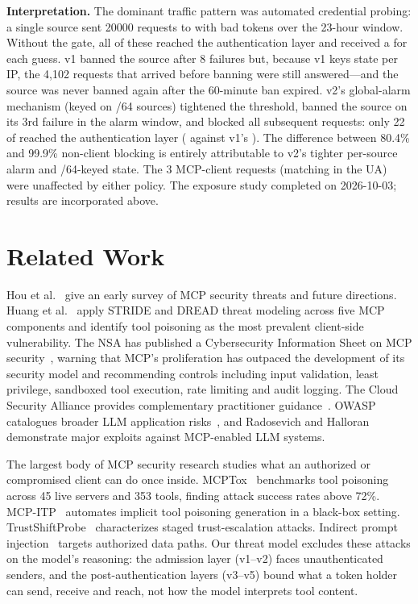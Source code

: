 \documentclass[10pt,twocolumn]{article}
\begin{document}
\noindent\textbf{Interpretation.}
The dominant traffic pattern was automated credential probing: a single source
sent \num{20000} requests to  with bad tokens over the 23-hour
window. Without the gate, all \RTNoneAuth{} of these reached the
authentication layer and received a  for each guess. v1 banned
the source after 8 failures but, because v1 keys state per IP, the 4{,}102
requests that arrived before banning were still answered---and
the source was never banned again after the 60-minute ban expired. v2's
global-alarm mechanism (keyed on /64 sources) tightened the threshold,
banned the source on its 3rd failure in the alarm window, and blocked all
subsequent requests: only 22 of \RTRequests{} reached the authentication
layer (\RTvTwoAuth{} against v1's \RTvOneAuth{}). The difference between
80.4\% and 99.9\% non-client blocking is entirely attributable to v2's
tighter per-source alarm and /64-keyed state. The 3 MCP-client requests
(matching  in the UA) were unaffected by either policy.
\else
The exposure study completed on 2026-10-03; results are incorporated above.
\fi

\section{Related Work}\label{sec:related}

Hou et al.~\citep{hou2025mcp} give an early survey of MCP security threats and
future directions. Huang et al.~\citep{mcpthreatmodel2026} apply STRIDE and
DREAD threat modeling across five MCP components and identify tool poisoning as
the most prevalent client-side vulnerability. The NSA has published a
Cybersecurity Information Sheet on MCP security~\citep{nsamcp2026}, warning
that MCP's proliferation has outpaced the development of its security model
and recommending controls including input validation, least privilege,
sandboxed tool execution, rate limiting and audit logging. The Cloud Security Alliance provides
complementary practitioner guidance~\citep{csamcp2026}. OWASP catalogues
broader LLM application risks~\citep{owaspllm2025}, and Radosevich and
Halloran~\citep{mcpsafetyaudit2025} demonstrate major exploits against MCP-enabled
LLM systems.

The largest body of MCP security research studies what an authorized or
compromised client can do once inside. MCPTox~\citep{mcptox2025} benchmarks
tool poisoning across 45 live servers and 353 tools, finding attack success
rates above 72\%. MCP-ITP~\citep{mcpitp2026} automates implicit tool poisoning
generation in a black-box setting. TrustShiftProbe~\citep{trustshift2026}
characterizes staged trust-escalation attacks. Indirect prompt
injection~\citep{greshake2023indirect} targets authorized data paths. Our
threat model excludes these attacks on the model's reasoning: the admission
layer (v1--v2) faces unauthenticated senders, and the post-authentication
layers (v3--v5) bound what a token holder can send, receive and reach, not
how the model interprets tool content.
\end{document}
